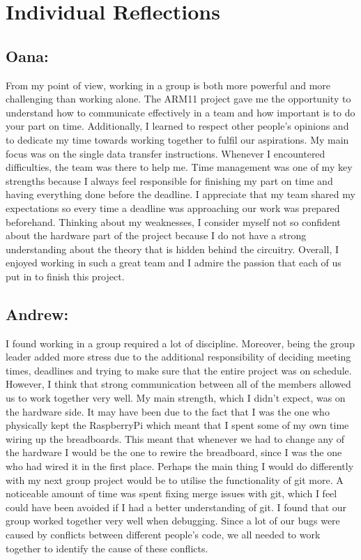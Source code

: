 \documentclass[11pt]{article}
\begin{document}
\section{Individual Reflections}
\subsection{Oana:}
From my point of view, working in a group is both more powerful and more challenging than working alone. The ARM11 project gave me the opportunity to understand how to communicate effectively in a team and how important is to do your part on time. Additionally, I learned to respect other people’s opinions and to dedicate my time towards working together to fulfil our aspirations. My main focus was on the single data transfer instructions. Whenever I encountered difficulties, the team was there to help me. Time management was one of my key strengths because I always feel responsible for finishing my part on time and having everything done before the deadline. I appreciate that my team shared my expectations so every time a deadline was approaching our work was prepared beforehand. Thinking about my weaknesses, I consider myself not so confident about the hardware part of the project because I do not have a strong understanding about the theory that is hidden behind the circuitry. Overall, I enjoyed working in such a great team and I admire the passion that each of us put in to finish this project. 

\subsection{Andrew:}
I found working in a group required a lot of discipline. Moreover, being the group leader added more stress due to the additional responsibility of deciding meeting times, deadlines and trying to make sure that the entire project was on schedule. However, I think that strong communication between all of the members allowed us to work together very well. My main strength, which I didn’t expect, was on the hardware side. It may have been due to the fact that I was the one who physically kept the RaspberryPi which meant that I spent some of my own time wiring up the breadboards. This meant that whenever we had to change any of the hardware I would be the one to rewire the breadboard, since I was the one who had wired it in the first place. Perhaps the main thing I would do differently with my next group project would be to utilise the functionality of git more. A noticeable amount of time was spent fixing merge issues with git, which I feel could have been avoided if I had a better understanding of git. I found that our group worked together very well when debugging. Since a lot of our bugs were caused by conflicts between different people’s code, we all needed to work together to identify the cause of these conflicts.
\end{document}
